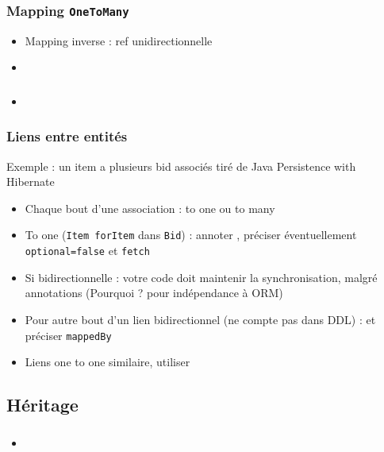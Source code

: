 \documentclass[english, french]{beamer}
\begin{document}
\begin{frame}
	\frametitle{Mapping \texttt{OneToMany}}
	\begin{itemize}
		\item Mapping inverse : ref  unidirectionnelle
		\item 
	\end{itemize}
	\begin{block}{}
		
	\end{block}
\end{frame}

\begin{frame}
	\frametitle{}
	\begin{itemize}
		\item 
	\end{itemize}
	\begin{block}{}
		
	\end{block}
\end{frame}

\begin{frame}
	\frametitle{Liens entre entités}
	Exemple : un item a plusieurs bid associés {\tiny tiré de Java Persistence with Hibernate}
	\begin{itemize}
		\item Chaque bout d’une association : to one ou to many
		\item To one (\texttt{Item forItem} dans \texttt{Bid}) : annoter , préciser éventuellement \texttt{optional=false} {\tiny et \texttt{fetch}}
		\item Si bidirectionnelle : votre code doit maintenir la synchronisation, malgré annotations (Pourquoi ? \pause pour indépendance à ORM)\pause
		\item Pour autre bout d’un lien bidirectionnel (ne compte pas dans DDL) :  et préciser \texttt{mappedBy}
		\item Liens one to one similaire, utiliser 
	\end{itemize}
\end{frame}

\subsection{Héritage}
\begin{frame}
	\frametitle{}
	\begin{itemize}
		\item 
	\end{itemize}
	\begin{block}{}
		
	\end{block}
\end{frame}
\end{document}
